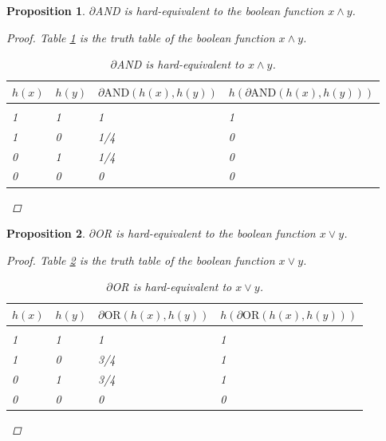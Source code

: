 \documentclass{article} %
\newtheorem{prop}{Proposition}
\begin{document}
\begin{prop}\label{prop:and}
	$\partial${AND} is hard-equivalent to the boolean function $x \wedge y$.
\begin{proof}
	Table \ref{and-table} is the truth table of the boolean function $x \wedge y$.
	\begin{table}
		\begin{center}
			\begin{tabular}{llll}
				\multicolumn{1}{c}{$h(x)$}  &\multicolumn{1}{c}{$h(y)$} &\multicolumn{1}{c}{$\partial\text{AND}(h(x), h(y))$} &\multicolumn{1}{c}{$h(\partial\text{AND}(h(x), h(y)))$}
				\\ \hline \\
				1 & 1 & 1 & 1\\
				1 & 0 & 1/4 & 0\\
				0 & 1 & 1/4 & 0\\
				0 & 0 & 0 & 0\\
			\end{tabular}
		\end{center}
		\caption{$\partial${AND} is hard-equivalent to $x \wedge y$.}\label{and-table}
		
	\end{table}
\end{proof}
\end{prop}

\begin{prop}\label{prop:or}
	$\partial${OR} is hard-equivalent to the boolean function $x \vee y$.
\begin{proof}
	Table \ref{or-table} is the truth table of the boolean function $x \vee y$.
	\begin{table}
		\begin{center}
			\begin{tabular}{llll}
				\multicolumn{1}{c}{$h(x)$}  &\multicolumn{1}{c}{$h(y)$} &\multicolumn{1}{c}{$\partial\text{OR}(h(x), h(y))$} &\multicolumn{1}{c}{$h(\partial\text{OR}(h(x), h(y)))$}
				\\ \hline \\
				1 & 1 & 1 & 1\\
				1 & 0 & 3/4 & 1\\
				0 & 1 & 3/4 & 1\\
				0 & 0 & 0 & 0\\
			\end{tabular}
		\end{center}
		\caption{$\partial${OR} is hard-equivalent to $x \vee y$.}\label{or-table}
		
	\end{table}
\end{proof}
\end{prop}
\end{document}
